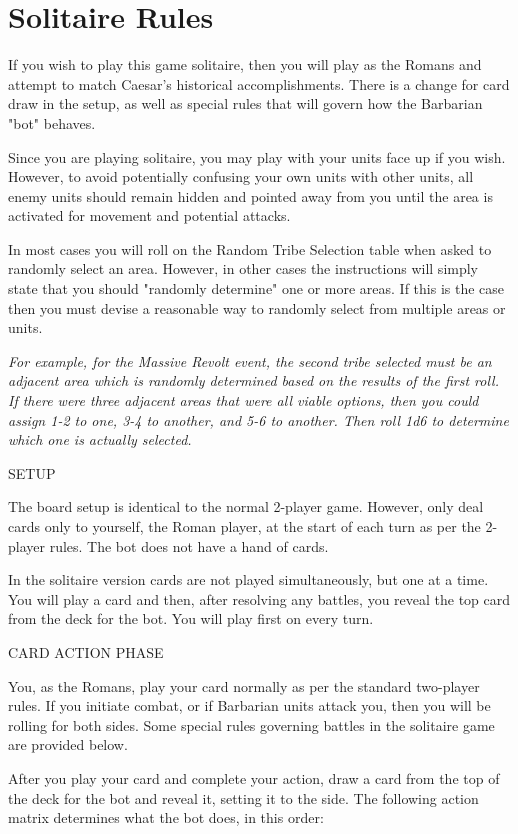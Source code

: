 \section{Solitaire Rules}

If you wish to play this game solitaire, then you will play as the Romans and attempt to match Caesar's historical accomplishments. There is a change for card draw in the setup, as well as special rules that will govern how the Barbarian "bot" behaves.

Since you are playing solitaire, you may play with your units face up if you wish. However, to avoid potentially confusing your own units with other units, all enemy units should remain hidden and pointed away from you until the area is activated for movement and potential attacks.

In most cases you will roll on the Random Tribe Selection table when asked to randomly select an area. However, in other cases the instructions will simply state that you should "randomly determine" one or more areas. If this is the case then you must devise a reasonable way to randomly select from multiple areas or units.

\textit{For example, for the Massive Revolt event, the second tribe selected must be an adjacent area which is randomly determined based on the results of the first roll. If there were three adjacent areas that were all viable options, then you could assign 1-2 to one, 3-4 to another, and 5-6 to another. Then roll 1d6 to determine which one is actually selected.}

SETUP

The board setup is identical to the normal 2-player game. However, only deal cards only to yourself, the Roman player, at the start of each turn as per the 2-player rules. The bot does not have a hand of cards.

In the solitaire version cards are not played simultaneously, but one at a time. You will play a card and then, after resolving any battles, you reveal the top card from the deck for the bot. You will play first on every turn.

CARD ACTION PHASE

You, as the Romans, play your card normally as per the standard two-player rules. If you initiate combat, or if Barbarian units attack you, then you will be rolling for both sides. Some special rules governing battles in the solitaire game are provided below.

After you play your card and complete your action, draw a card from the top of the deck for the bot and reveal it, setting it to the side. The following action matrix determines what the bot does, in this order:

